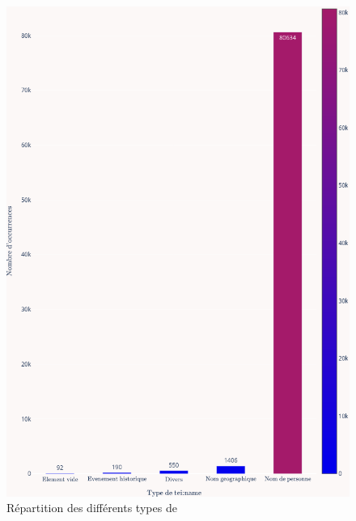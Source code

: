 \begin{figure}
	\centering
	\includegraphics[width=\linewidth]{annexes/fig_teinametypes.png}
	\caption{Répartition des différents types de \tname{}}
	\label{appendix:tnametypes}
\end{figure}

